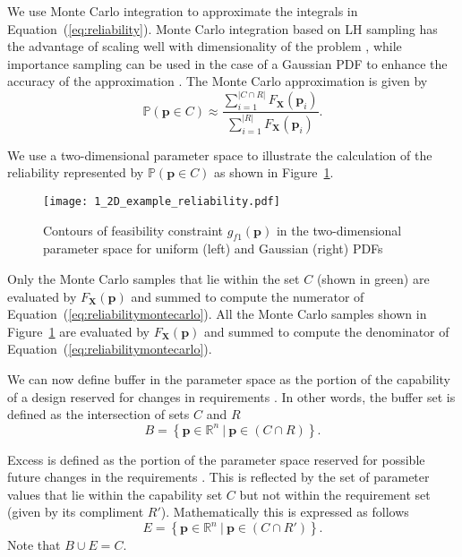 We use Monte Carlo integration to approximate the integrals in Equation~(\ref{eq:reliability}). Monte Carlo integration based on \acf{LH} sampling has the advantage of scaling well with dimensionality of the problem \cite{Magnusen1997,Zhang2016}, while importance sampling can be used in the case of a Gaussian \ac{PDF} to enhance the accuracy of the approximation \cite{Frangopol2003a,ForouzandehShahraki2014,Kleiber2004}. The Monte Carlo approximation is given by
%
\begin{equation} \label{eq:reliabilitymontecarlo}
	\mathbb{P}(\mathbf{p} \in C) \approx \dfrac{\sum\limits_{i=1}^{|{C\cap R}|} F_{\mathbf{X}}(\mathbf{p}_i)}{\sum\limits_{i=1}^{|R|} F_{\mathbf{X}}(\mathbf{p}_i)}.
\end{equation}

We use a two-dimensional parameter space to illustrate the calculation of the reliability represented by  $\mathbb{P}(\mathbf{p} \in C)$ as shown in Figure~\ref{fig:2Dexamplereliability}.
%
\begin{figure}[h]
	\centering
	\texttt{[image: 1\_2D\_example\_reliability.pdf]}
	\caption{{\color{red} Contours of feasibility constraint $g_{f1}(\mathbf{p})$ in the two-dimensional parameter space for uniform (left) and Gaussian (right) \acp{PDF}}}
	\label{fig:2Dexamplereliability}
\end{figure}
%
Only the Monte Carlo samples that lie within the set $C$ (shown in green) are evaluated by $F_{\mathbf{X}}(\mathbf{p})$ and summed to compute the numerator of Equation~(\ref{eq:reliabilitymontecarlo}). All the Monte Carlo samples shown in Figure~\ref{fig:2Dexamplereliability} are evaluated by $F_{\mathbf{X}}(\mathbf{p})$ and summed to compute the denominator of Equation~(\ref{eq:reliabilitymontecarlo}). %

We can now define buffer in the parameter space as the portion of the capability of a design reserved for changes in requirements \cite{Eckert2019}. In other words, the buffer set is defined as the intersection of sets $C$ and $R$
%
\begin{equation} \label{eq:buffer}
	\textit{B} = \left\{\mathbf{p} \in \mathbb{R}^n~|~\mathbf{p} \in \left(C\cap R\right) \right\}.
\end{equation}

Excess is defined as the portion of the parameter space reserved for possible future changes in the requirements \cite{Eckert2019}. This is reflected by the set of parameter values that lie within the capability set $C$ but not within the requirement set (given by its compliment $R'$). Mathematically this is expressed as follows
% 
\begin{equation} \label{eq:excess}
	\textit{E} = \left\{\mathbf{p} \in \mathbb{R}^n~|~\mathbf{p} \in \left(C\cap R'\right) \right\}.
\end{equation}
%
Note that  $B\cup E = C$.

